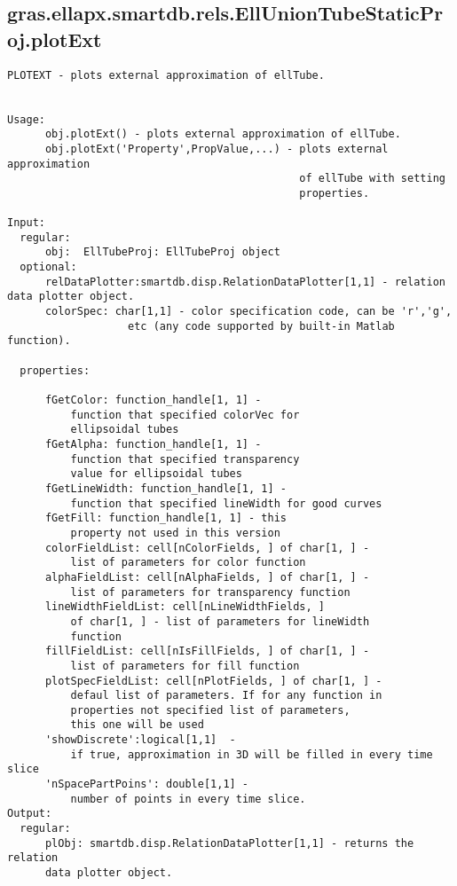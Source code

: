 \subsection{\texorpdfstring{gras.ellapx.smartdb.rels.EllUnionTubeStaticProj.plotExt}{plotExt}}\label{method:gras.ellapx.smartdb.rels.EllUnionTubeStaticProj.plotExt}
\begin{verbatim}
PLOTEXT - plots external approximation of ellTube.


Usage:
      obj.plotExt() - plots external approximation of ellTube.
      obj.plotExt('Property',PropValue,...) - plots external approximation
                                              of ellTube with setting
                                              properties.

Input:
  regular:
      obj:  EllTubeProj: EllTubeProj object
  optional:
      relDataPlotter:smartdb.disp.RelationDataPlotter[1,1] - relation data plotter object.
      colorSpec: char[1,1] - color specification code, can be 'r','g',
                   etc (any code supported by built-in Matlab function).

  properties:

      fGetColor: function_handle[1, 1] -
          function that specified colorVec for
          ellipsoidal tubes
      fGetAlpha: function_handle[1, 1] -
          function that specified transparency
          value for ellipsoidal tubes
      fGetLineWidth: function_handle[1, 1] -
          function that specified lineWidth for good curves
      fGetFill: function_handle[1, 1] - this
          property not used in this version
      colorFieldList: cell[nColorFields, ] of char[1, ] -
          list of parameters for color function
      alphaFieldList: cell[nAlphaFields, ] of char[1, ] -
          list of parameters for transparency function
      lineWidthFieldList: cell[nLineWidthFields, ]
          of char[1, ] - list of parameters for lineWidth
          function
      fillFieldList: cell[nIsFillFields, ] of char[1, ] -
          list of parameters for fill function
      plotSpecFieldList: cell[nPlotFields, ] of char[1, ] -
          defaul list of parameters. If for any function in
          properties not specified list of parameters,
          this one will be used
      'showDiscrete':logical[1,1]  -
          if true, approximation in 3D will be filled in every time slice
      'nSpacePartPoins': double[1,1] -
          number of points in every time slice.
Output:
  regular:
      plObj: smartdb.disp.RelationDataPlotter[1,1] - returns the relation
      data plotter object.
\end{verbatim}
